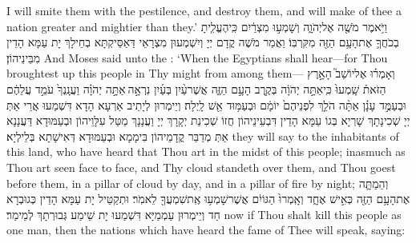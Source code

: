 {I will smite them with the pestilence, and destroy them, and will make of thee a nation greater and mightier than they.’}{}
{וַיֹּ֥אמֶר מֹשֶׁ֖ה אֶל\maqqaf יְהֹוָ֑ה וְשָׁמְע֣וּ מִצְרַ֔יִם כִּֽי\maqqaf הֶעֱלִ֧יתָ בְכֹחֲךָ֛ אֶת\maqqaf הָעָ֥ם הַזֶּ֖ה מִקִּרְבּֽוֹ׃}
{וַאֲמַר מֹשֶׁה קֳדָם יְיָ וְיִשְׁמְעוּן מִצְרָאֵי דַּאַסֵּיקְתָּא בְחֵילָךְ יָת עַמָּא הָדֵין מִבֵּינֵיהוֹן׃}
{And Moses said unto the \lord: ‘When the Egyptians shall hear—for Thou broughtest up this people in Thy might from among them—}{}
{וְאָמְר֗וּ אֶל\maqqaf יוֹשֵׁב֮ הָאָ֣רֶץ הַזֹּאת֒ שָֽׁמְעוּ֙ כִּֽי\maqqaf אַתָּ֣ה יְהֹוָ֔ה בְּקֶ֖רֶב הָעָ֣ם הַזֶּ֑ה אֲשֶׁר\maqqaf עַ֨יִן בְּעַ֜יִן נִרְאָ֣ה \legarmeh  אַתָּ֣ה יְהֹוָ֗ה וַעֲנָֽנְךָ֙ עֹמֵ֣ד עֲלֵהֶ֔ם וּבְעַמֻּ֣ד עָנָ֗ן אַתָּ֨ה הֹלֵ֤ךְ לִפְנֵיהֶם֙ יוֹמָ֔ם וּבְעַמּ֥וּד אֵ֖שׁ לָֽיְלָה׃}
{וְיֵימְרוּן לְיָתֵיב אַרְעָא הָדָא דִּשְׁמַעוּ אֲרֵי אַתְּ יְיָ שְׁכִינָתָךְ שָׁרְיָא בְּגוֹ עַמָּא הָדֵין דִּבְעֵינֵיהוֹן חֲזוֹ שְׁכִינַת יְקָרָךְ יְיָ וַעֲנָנָךְ מַטַּל עִלָּוֵיהוֹן וּבְעַמּוּדָא דַּעֲנָנָא אַתְּ מְדַבַּר קֳדָמֵיהוֹן בִּימָמָא וּבְעַמּוּדָא דְּאִישָׁתָא בְּלֵילְיָא׃}
{they will say to the inhabitants of this land, who have heard that Thou \lord\space art in the midst of this people; inasmuch as Thou \lord\space art seen face to face, and Thy cloud standeth over them, and Thou goest before them, in a pillar of cloud by day, and in a pillar of fire by night;}{}
{וְהֵמַתָּ֛ה אֶת\maqqaf הָעָ֥ם הַזֶּ֖ה כְּאִ֣ישׁ אֶחָ֑ד וְאָֽמְרוּ֙ הַגּוֹיִ֔ם אֲשֶׁר\maqqaf שָׁמְע֥וּ אֶֽת\maqqaf שִׁמְעֲךָ֖ לֵאמֹֽר׃}
{וּתְקַטֵּיל יָת עַמָּא הָדֵין כְּגוּבְרָא חַד וְיֵימְרוּן עַמְמַיָּא דִּשְׁמַעוּ יָת שֵׁימַע גְּבוּרְתָךְ לְמֵימַר׃}
{now if Thou shalt kill this people as one man, then the nations which have heard the fame of Thee will speak, saying:}{}

